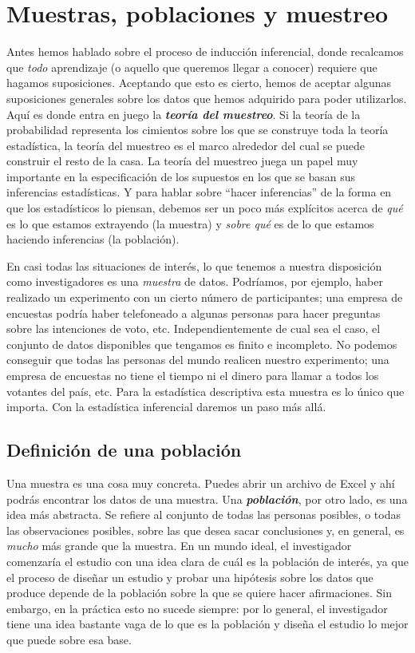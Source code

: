 \documentclass[spanish,]{book}
\begin{document}
\section{Muestras, poblaciones y muestreo}\label{srs}

Antes hemos hablado sobre el proceso de inducción inferencial, donde
recalcamos que \emph{todo} aprendizaje (o aquello que queremos llegar a
conocer) requiere que hagamos suposiciones. Aceptando que esto es
cierto, hemos de aceptar algunas suposiciones generales sobre los datos
que hemos adquirido para poder utilizarlos. Aquí es donde entra en juego
la \textbf{\emph{teoría del muestreo}}. Si la teoría de la probabilidad
representa los cimientos sobre los que se construye toda la teoría
estadística, la teoría del muestreo es el marco alrededor del cual se
puede construir el resto de la casa. La teoría del muestreo juega un
papel muy importante en la especificación de los supuestos en los que se
basan sus inferencias estadísticas. Y para hablar sobre ``hacer
inferencias'' de la forma en que los estadísticos lo piensan, debemos
ser un poco más explícitos acerca de \emph{qué} es lo que estamos
extrayendo (la muestra) y \emph{sobre qué} es de lo que estamos haciendo
inferencias (la población).

En casi todas las situaciones de interés, lo que tenemos a nuestra
disposición como investigadores es una \emph{muestra} de datos.
Podríamos, por ejemplo, haber realizado un experimento con un cierto
número de participantes; una empresa de encuestas podría haber
telefoneado a algunas personas para hacer preguntas sobre las
intenciones de voto, etc. Independientemente de cual sea el caso, el
conjunto de datos disponibles que tengamos es finito e incompleto. No
podemos conseguir que todas las personas del mundo realicen nuestro
experimento; una empresa de encuestas no tiene el tiempo ni el dinero
para llamar a todos los votantes del país, etc. Para la estadística
descriptiva esta muestra es lo único que importa. Con la estadística
inferencial daremos un paso más allá.

\subsection{Definición de una población}\label{pop}

Una muestra es una cosa muy concreta. Puedes abrir un archivo de Excel y
ahí podrás encontrar los datos de una muestra. Una
\textbf{\emph{población}}, por otro lado, es una idea más abstracta. Se
refiere al conjunto de todas las personas posibles, o todas las
observaciones posibles, sobre las que desea sacar conclusiones y, en
general, es \emph{mucho} más grande que la muestra. En un mundo ideal,
el investigador comenzaría el estudio con una idea clara de cuál es la
población de interés, ya que el proceso de diseñar un estudio y probar
una hipótesis sobre los datos que produce depende de la población sobre
la que se quiere hacer afirmaciones. Sin embargo, en la práctica esto no
sucede siempre: por lo general, el investigador tiene una idea bastante
vaga de lo que es la población y diseña el estudio lo mejor que puede
sobre esa base.
\end{document}
